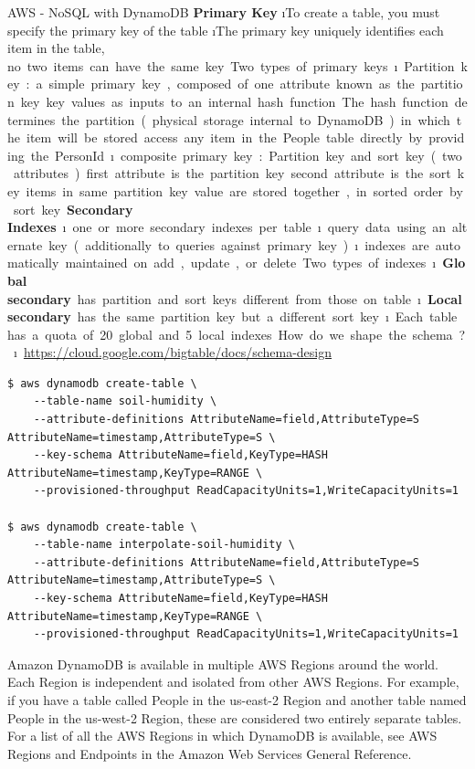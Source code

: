 \begin{frame}{AWS - NoSQL with DynamoDB}
\textbf{Primary Key}
\i To create a table, you must specify the primary key of the table
\i The primary key uniquely identifies each item in the table, 
\si no two items can have the same key.

Two types of primary keys
\i Partition key: a simple primary key, composed of one attribute known as the partition key
\si key values as inputs to an internal hash function
\si The hash function determines the partition (physical storage internal to DynamoDB) in which the item will be stored
\si access any item in the People table directly by providing the PersonId

\i composite primary key: Partition key and sort key (two attributes)
\si first attribute is the partition key
\si second attribute is the sort key
\si items in same partition key value are stored together, in sorted order by sort key

\textbf{Secondary Indexes}
\i one or more secondary indexes per table
\i query data using an alternate key (additionally to queries against primary key) 
\i indexes are automatically maintained on add, update, or delete

Two types of indexes
\i \textbf{Global secondary} has partition and sort keys different from those on table
\i \textbf{Local secondary} has the same partition key but a different sort key
\i Each table has a quota of 20 global and 5 local indexes

How do we shape the schema?
\i \url{https://cloud.google.com/bigtable/docs/schema-design}

\begin{lstlisting}
$ aws dynamodb create-table \
    --table-name soil-humidity \
    --attribute-definitions AttributeName=field,AttributeType=S AttributeName=timestamp,AttributeType=S \
    --key-schema AttributeName=field,KeyType=HASH AttributeName=timestamp,KeyType=RANGE \
    --provisioned-throughput ReadCapacityUnits=1,WriteCapacityUnits=1
    
$ aws dynamodb create-table \
    --table-name interpolate-soil-humidity \
    --attribute-definitions AttributeName=field,AttributeType=S AttributeName=timestamp,AttributeType=S \
    --key-schema AttributeName=field,KeyType=HASH AttributeName=timestamp,KeyType=RANGE \
    --provisioned-throughput ReadCapacityUnits=1,WriteCapacityUnits=1
\end{lstlisting}

Amazon DynamoDB is available in multiple AWS Regions around the world. Each Region is independent and isolated from other AWS Regions. For example, if you have a table called People in the us-east-2 Region and another table named People in the us-west-2 Region, these are considered two entirely separate tables. For a list of all the AWS Regions in which DynamoDB is available, see AWS Regions and Endpoints in the Amazon Web Services General Reference.


\end{frame}
